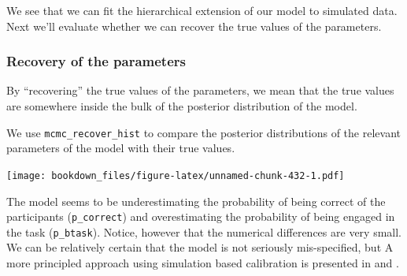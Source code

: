\documentclass[12pt,]{krantz}
\newenvironment{Shaded}{\begin{snugshade}}{\end{snugshade}}
\newcommand{\DecValTok}[1]{\textcolor[rgb]{0.00,0.00,0.81}{#1}}
\newcommand{\KeywordTok}[1]{\textcolor[rgb]{0.13,0.29,0.53}{\textbf{#1}}}
\newcommand{\NormalTok}[1]{#1}
\newcommand{\OperatorTok}[1]{\textcolor[rgb]{0.81,0.36,0.00}{\textbf{#1}}}
\newcommand{\StringTok}[1]{\textcolor[rgb]{0.31,0.60,0.02}{#1}}
\theoremstyle{definition}
\theoremstyle{definition}
\theoremstyle{definition}
\theoremstyle{remark}
\begin{document}
We see that we can fit the hierarchical extension of our model to simulated data. Next we'll evaluate whether we can recover the true values of the parameters.

\hypertarget{recovery-of-the-parameters}{%
\subsubsection{Recovery of the parameters}\label{recovery-of-the-parameters}}

By ``recovering'' the true values of the parameters, we mean that the true values are somewhere inside the bulk of the posterior distribution of the model.

We use \texttt{mcmc\_recover\_hist} to compare the posterior distributions of the relevant parameters of the model with their true values.

\begin{Shaded}
\end{Shaded}

\texttt{[image: bookdown\_files/figure-latex/unnamed-chunk-432-1.pdf]}

The model seems to be underestimating the probability of being correct of the participants (\texttt{p\_correct}) and overestimating the probability of being engaged in the task (\texttt{p\_btask}). Notice, however that the numerical differences are very small. We can be relatively certain that the model is not seriously mis-specified, but A more principled approach using simulation based calibration is presented in \citet{talts2018validating} and \citet{schad2020toward}.
\end{document}
